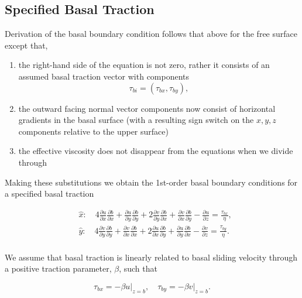 \subsection{Specified Basal Traction}
Derivation of the basal boundary condition follows that above for the free surface except that,
\begin{enumerate}

\item the right-hand side of the equation is not zero, rather it consists of an assumed basal traction vector with components 
\begin{equation}
\tau_{bi} = \left( \tau _{bx},\tau _{by} \right),
\end{equation}

\item the outward facing normal vector components now consist of horizontal gradients in the basal surface (with a resulting sign switch on the $x,y,z$ components relative to the upper surface)

\item the effective viscosity does not disappear from the equations when we divide through
\end{enumerate}

Making these substitutions we obtain the 1st-order basal boundary conditions for a specified basal traction

\begin{equation}
\begin{split}
  & \hat{x}:\quad 4\frac{\partial u}{\partial x}\frac{\partial b}{\partial x}+\frac{\partial u}{\partial y}\frac{\partial b}{\partial y}+2\frac{\partial v}{\partial y}\frac{\partial b}{\partial x}+\frac{\partial v}{\partial x}\frac{\partial b}{\partial y}-\frac{\partial u}{\partial z}=\frac{\tau _{bx}}{\eta }, \\ 
 & \hat{y}:\quad 4\frac{\partial v}{\partial y}\frac{\partial b}{\partial y}+\frac{\partial v}{\partial x}\frac{\partial b}{\partial x}+2\frac{\partial u}{\partial x}\frac{\partial b}{\partial y}+\frac{\partial u}{\partial y}\frac{\partial b}{\partial x}-\frac{\partial v}{\partial z}=\frac{\tau _{by}}{\eta }. \\
\end{split}
 \end{equation}

We assume that basal traction is linearly related to basal sliding velocity through a positive traction parameter, $\beta$, such that

\begin{equation}
\label{basaltraction}
\tau _{bx}=\left. -\beta u \right|_{z=b},\quad \tau _{by}=\left. -\beta v \right|_{z=b}.
\end{equation}

